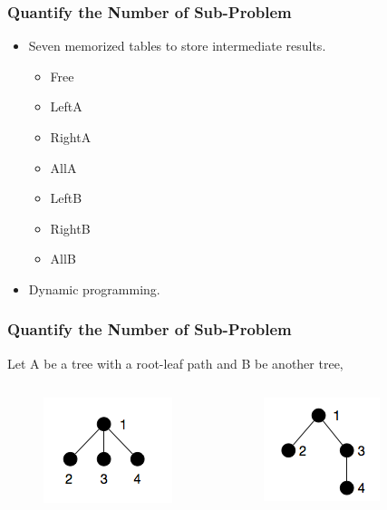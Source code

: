 \documentclass{beamer}
\begin{document}
\begin{frame}
\frametitle{Quantify the Number of Sub-Problem}
\begin{itemize}
\item Seven memorized tables to store intermediate results.
\begin{itemize}
\item Free
\item LeftA
\item RightA
\item AllA
\item LeftB
\item RightB
\item AllB
\end{itemize}
\item Dynamic programming.
\end{itemize}
\end{frame}
\begin{frame}
\frametitle{Quantify the Number of Sub-Problem}
Let A be a tree with a root-leaf path and B be another tree,
\begin{columns}[c]
\begin{figure}
	\includegraphics[width=0.3\linewidth]{treeA}
	\centering
\end{figure}
\begin{figure}
	\includegraphics[width=0.3\linewidth]{treeB}
	\centering
\end{figure}
\end{columns}
\end{frame}
\end{document}
